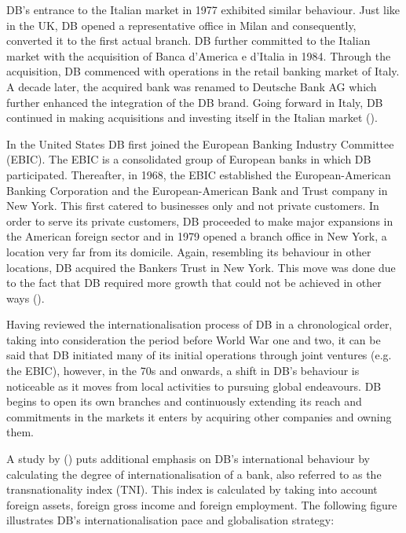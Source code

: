 \documentclass[11pt,a4paper]{article}
\begin{document}
{{DB's entrance to the Italian market in 1977 exhibited similar behaviour. Just like in the UK, DB opened a representative office in Milan and consequently, converted it to the first actual branch. DB further committed to the Italian market with the acquisition of Banca d'America e d'Italia in 1984. Through the acquisition, DB commenced with operations in the retail banking market of Italy. A decade later, the acquired bank was renamed to Deutsche Bank AG which further enhanced the integration of the DB brand. %
Going forward in Italy, DB continued in making acquisitions and investing itself in the Italian market (\cite{deutschebankagDeutscheBankItaly}). \par
In the United States DB first joined the European Banking Industry Committee (EBIC). The EBIC is a consolidated group of European banks in which DB participated. Thereafter, in 1968, the EBIC established the European-American Banking Corporation and the European-American Bank and Trust company in New York. This first catered to businesses only and not private customers. 
In order to serve its private customers, DB proceeded to make major expansions in the American foreign sector and in 1979 opened a branch office in New York, a location very far from its domicile. Again, resembling its behaviour in other locations, DB acquired the Bankers Trust in New York. This move was done due to the fact that DB required more growth that could not be achieved in other ways (\cite{deutschebankagDeutscheBankUS}).   \par
Having reviewed the internationalisation process of DB in a chronological order, taking into consideration the period before World War one and two, it can be said that DB initiated many of its initial operations through joint ventures (e.g. the EBIC), however, in the 70s and onwards, a shift in DB's behaviour is noticeable as it moves from local activities to pursuing global endeavours. DB begins to open its own branches and continuously extending its reach and commitments in the markets it enters by acquiring other companies and owning them. \par
A study by \citeauthor{slagerInternationalizationBanksStrategic2005} (\citeyear{slagerInternationalizationBanksStrategic2005}) puts additional emphasis on DB's international behaviour by calculating the degree of internationalisation of a bank, also referred to as the transnationality index (TNI). This index is calculated by taking into account foreign assets, foreign gross income and foreign employment. The following figure illustrates DB's internationalisation pace and globalisation strategy:

}}
\end{document}
